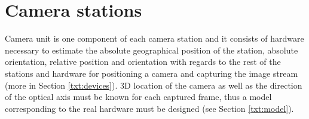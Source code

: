 \vata[20]

%
%	
%
%


\chapter{Camera stations}

Camera unit is one component of each camera station and it consists of hardware necessary to estimate the absolute geographical position of the station, absolute orientation, relative position and orientation with regards to the rest of the stations and hardware for positioning a camera and capturing the image stream (more in Section \ref{txt:devices}). 3D location of the camera as well as the direction of the optical axis must be known for each captured frame, thus a model corresponding to the real hardware must be designed (see Section \ref{txt:model}).

